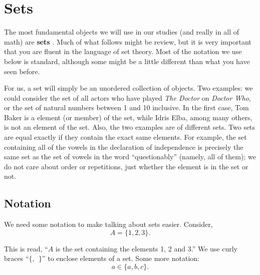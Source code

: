 \documentclass[10pt,]{book}
\newcommand{\terminology}[1]{\textbf{#1}}
\theoremstyle{plain}
\theoremstyle{definition}
\theoremstyle{definition}
\theoremstyle{definition}
\numberwithin{equation}{section}
\begin{document}
\section[Sets]{Sets}\label{sec_intro-sets}
\typeout{************************************************}
\typeout{************************************************}

      The most fundamental objects we will use in our studies (and really in all of math) are
      \terminology{sets}
      . Much of what follows might be review, but it is very important that you are fluent in the language of set theory. Most of the notation we use below is standard, although some might be a little different than what you have seen before.
\par

      For us, a set will simply be an unordered collection of objects. Two examples: we could consider the set of all actors who have played \emph{The Doctor} on \emph{Doctor Who}, or the set of natural numbers between 1 and 10 inclusive. In the first case, Tom Baker is a element (or member) of the set, while Idris Elba, among many others, is not an element of the set. Also, the two examples are of different sets. Two sets are equal exactly if they contain the exact same elements. For example, the set containing all of the vowels in the declaration of independence is precisely the same set as the set of vowels in the word ``questionably'' (namely, all of them); we do not care about order or repetitions, just whether the element is in the set or not.
\typeout{************************************************}
\typeout{************************************************}
\subsection[Notation]{Notation}\label{subsec_notation}

      We need some notation to make talking about sets easier. Consider,
      \begin{equation*}
        A = \{1, 2, 3\}.
      \end{equation*}
\par

      This is read, ``\(A\) is the set containing the elements 1, 2 and 3.'' We use curly braces ``\(\{,~~ \}\)'' to enclose elements of a set. Some more notation:
      \begin{equation*}
        a \in \{a, b, c\}.
      \end{equation*}
\par
\end{document}

